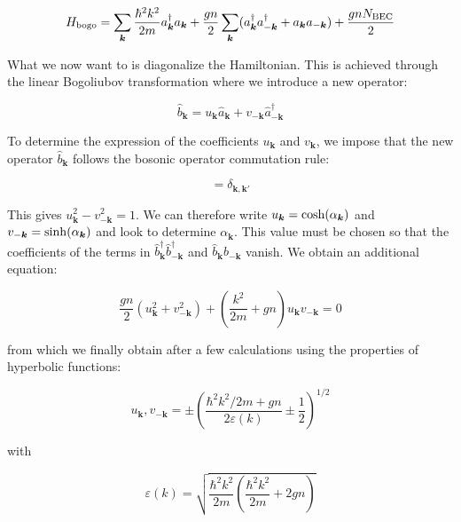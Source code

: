 \begin{equation}
    H_{\rm{bogo}}=\sum_{\bm{k}}\frac{\hbar^2 k^2}{2m} a^{\dagger}_{\bm{k}}  a_{\bm{k}} +  \frac{gn}{2} \sum_{\bm{k}} (a^{\dagger}_{\bm{k}} a^{\dagger}_{-\bm{k}} +a_{\bm{k}} a_{-\bm{k}})+\frac{gnN_{\rm{BEC}}}{2}
\end{equation}

What we now want to is diagonalize the Hamiltonian. This is achieved through the linear Bogoliubov transformation where we introduce a new operator:

\begin{equation}
    \hat{b}_{\bm{k}}=u_{\bm{k}} \hat{a}_{\bm{k}} + v_{-\bm{k}} \hat{a}^{\dagger}_{-\bm{k}}
\end{equation}

To determine the expression of the coefficients $u_{\bm{k}}$ and $v_{\bm{k}}$, we impose that the new operator $\hat{b}_{\bm{k}}$ follows the bosonic operator commutation rule:

\begin{equation}
    [\hat{b}_{\bm{k}},\hat{b}^{\dagger}_{\bm{k}'}]= \delta_{\bm{k},\bm{k}'}
\end{equation}

This gives $u_{\bm{k}}^2 -  v_{-\bm{k}}^2 =1$. We can therefore write $u_{\bm{k}}={\rm cosh}(\alpha_{\bm{k}})$ and $v_{-\bm{k}}={\rm sinh}(\alpha_{\bm{k}})$ and look to determine $\alpha_{\bm{k}}$. This value must be chosen so that the coefficients of the terms in $\hat{b}^{\dagger}_{\bm{k}} \hat{b}^{\dagger}_{-\bm{k}}$ and $\hat{b}_{\bm{k}} \hat{b}_{-\bm{k}}$ vanish. We obtain an additional equation:

\begin{equation}
    \frac{g n}{2}\left(u_{\bm{k}}^{2}+v_{-\bm{k}}^{2}\right)+\left(\frac{k^{2}}{2 m}+g n\right) u_{\bm{k}} v_{-\bm{k}}=0
\end{equation}

from which we finally obtain after a few calculations using the properties of hyperbolic functions:

\begin{equation}
    u_{\bm{k}}, v_{-\bm{k}}=\pm\left(\frac{\hbar^2k^{2} / 2 m+g n}{2 \varepsilon(k)} \pm \frac{1}{2}\right)^{1 / 2}
\end{equation}

with 

\begin{equation}
    \varepsilon(k)=\sqrt{\frac{\hbar^2 k^2}{2m}(\frac{\hbar^2 k^2}{2m}+2gn)}
\end{equation}

